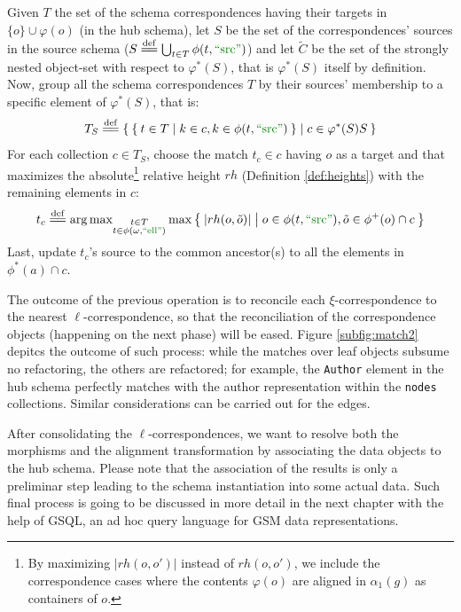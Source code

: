 \begin{example}[continues=ex:examplegraphdata,label=ex:examplereferencedOcaml]
\begin{itemize}
	Given $T$ the set of the schema correspondences having their targets in $\{o\}\cup\varphi(o)$ (in the hub schema), let $S$ be the set of the correspondences' sources in the source schema ($S\eqdef \bigcup_{t\in T}\phi(t,\SRC)$) and let $\tilde{C}$ be the set of the strongly nested object-set  with respect to $\varphi^*(S)$, that is $\varphi^*(S)$ itself by definition. Now, group all the schema correspondences $T$ by their sources' membership to a specific element of $\varphi^*(S)$, that is:
	\[T_{S}\eqdef\Set{\Set{t\in T|k\in c, k\in \phi(t,\SRC)}|c\in \varphi^*(S)S}\]
	For each collection $c\in T_{S}$, choose the match $t_c\in c$ having $o$ as a target and that maximizes the absolute\footnote{By maximizing $|rh(o,o')|$ instead of $rh(o,o')$, we include the correspondence cases where the contents $\varphi(o)$ are aligned in $\alpha_1(g)$ as containers of $o$.} relative height $rh$ (Definition \vref{def:heights}) with the remaining elements in $c$:
	\[t_c\eqdef\argmax_{\substack{t\in T\\ t\in\phi(\omega,\mstr{ell})}}\max\Set{\left|rh(o,\tilde{o})\right||o\in\phi(t,\SRC),\tilde{o}\in\phi^+(o)\cap c}\]
	Last, update $t_c$'s source to the common ancestor(s) to all the elements in $\phi^*(a)\cap c$.
	
\end{itemize}
The outcome of the previous operation is to reconcile each $\xi$-correspondence to the nearest $\ell$-correspondence, so that the reconciliation of the correspondence objects (happening on the next phase) will be eased.
Figure \ref{subfig:match2} depitcs the outcome of such process: while the matches over leaf objects subsume no refactoring, the others are refactored; for example, the \texttt{Author} element in the hub schema perfectly matches with the author representation within the \texttt{nodes} collections. Similar considerations can be carried out for the edges.

After consolidating the $\ell$-correspondences, we want to resolve both the morphisms and the alignment transformation by associating the data objects to the hub schema. Please note that the association of the results is only a preliminar step leading to the schema instantiation into some actual data. Such final process  { is going to be discussed in more detail in the next chapter with the help of GSQL, an ad hoc query language for GSM data representations}. 


\end{example}
